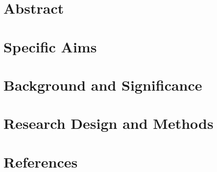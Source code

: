 \documentclass[12pt]{article}
\begin{document}
	
	\section*{Abstract}

	\section*{Specific Aims}

	\section*{Background and Significance}

	\section*{Research Design and Methods}
	
	\pagebreak
	\section*{References}
	\printbibliography
\end{document}
